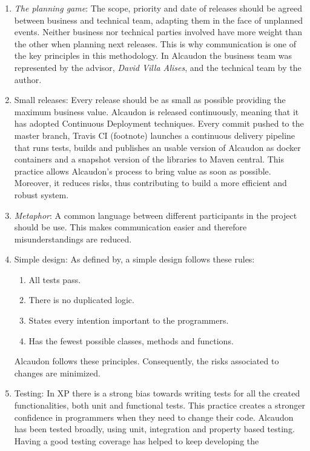 \begin{enumerate}
\item \textit{The planning game}: The scope, priority and date of releases
  should be agreed between business and technical team, adapting them in the
  face of unplanned events. Neither business nor technical parties involved have
  more weight than the other when planning next releases. This is why
  communication is one of the key principles in this methodology. In Alcaudon
  the business team was represented by the advisor, \textit{David Villa Alises},
  and the technical team by the author.
\item Small releases: Every release should be as small as possible providing the
  maximum business value. Alcaudon is released continuously, meaning that it has
  adopted Continuous Deployment\cite{cd} techniques. Every commit pushed to the
  master branch, Travis CI (footnote) launches a continuous delivery pipeline
  that runs tests, builds and publishes an usable version of Alcaudon as docker
  containers and a snapshot version of the libraries to Maven central. This
  practice allows Alcaudon's process to bring value as soon as possible.
  Moreover, it reduces risks, thus contributing to build a more efficient and
  robust system.
\item \textit{Metaphor}: A common language between different participants in the
  project should be use. This makes communication easier and therefore
  misunderstandings are reduced.
\item Simple design: As defined by\cite{xp}, a simple design follows these rules:
  \begin{enumerate}
  \item All tests pass.
  \item There is no duplicated logic.
  \item States every intention important to the programmers.
  \item Has the fewest possible classes, methods and functions.
  \end{enumerate}
  Alcaudon follows these principles. Consequently, the risks associated to
  changes are minimized.
\item Testing: In XP there is a strong bias towards writing tests for all the
  created functionalities, both unit and functional tests. This practice creates
  a stronger confidence in programmers when they need to change their code.
  Alcaudon has been tested broadly, using unit, integration and property based
  testing. Having a good testing coverage has helped to keep developing the

\end{enumerate}
